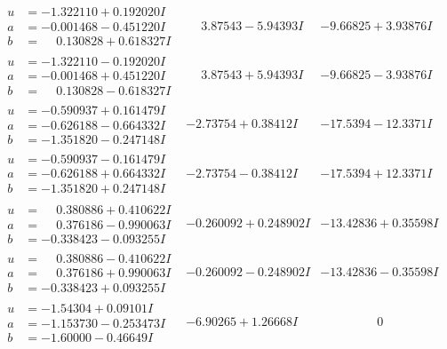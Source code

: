 \documentclass[1p]{elsarticle_modified}
\theoremstyle{definition}
\begin{document}
$$\begin{array}{c|c|c}
\begin{aligned}
u &= -1.322110 + 0.192020 I \\
a &= -0.001468 - 0.451220 I \\
b &= \phantom{-}0.130828 + 0.618327 I\end{aligned}
 & \phantom{-}3.87543 - 5.94393 I & -9.66825 + 3.93876 I \\ \hline\begin{aligned}
u &= -1.322110 - 0.192020 I \\
a &= -0.001468 + 0.451220 I \\
b &= \phantom{-}0.130828 - 0.618327 I\end{aligned}
 & \phantom{-}3.87543 + 5.94393 I & -9.66825 - 3.93876 I \\ \hline\begin{aligned}
u &= -0.590937 + 0.161479 I \\
a &= -0.626188 - 0.664332 I \\
b &= -1.351820 - 0.247148 I\end{aligned}
 & -2.73754 + 0.38412 I & -17.5394 - 12.3371 I \\ \hline\begin{aligned}
u &= -0.590937 - 0.161479 I \\
a &= -0.626188 + 0.664332 I \\
b &= -1.351820 + 0.247148 I\end{aligned}
 & -2.73754 - 0.38412 I & -17.5394 + 12.3371 I \\ \hline\begin{aligned}
u &= \phantom{-}0.380886 + 0.410622 I \\
a &= \phantom{-}0.376186 - 0.990063 I \\
b &= -0.338423 - 0.093255 I\end{aligned}
 & -0.260092 + 0.248902 I & -13.42836 + 0.35598 I \\ \hline\begin{aligned}
u &= \phantom{-}0.380886 - 0.410622 I \\
a &= \phantom{-}0.376186 + 0.990063 I \\
b &= -0.338423 + 0.093255 I\end{aligned}
 & -0.260092 - 0.248902 I & -13.42836 - 0.35598 I \\ \hline\begin{aligned}
u &= -1.54304 + 0.09101 I \\
a &= -1.153730 - 0.253473 I \\
b &= -1.60000 - 0.46649 I\end{aligned}
 & -6.90265 + 1.26668 I & \phantom{-0.000000 } 0 \\ \hline\begin{aligned}

\end{aligned}
\end{array}$$
\end{document}
